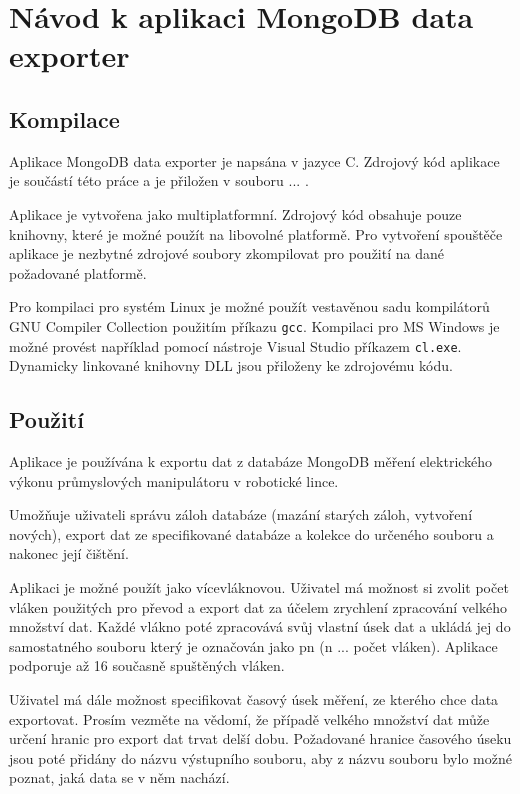 \chapter{Návod k aplikaci MongoDB data exporter}
\label{appendix1}
\section{Kompilace}

Aplikace MongoDB data exporter je napsána v jazyce C. Zdrojový kód aplikace je součástí této práce a je přiložen v souboru ... .

Aplikace je vytvořena jako multiplatformní. Zdrojový kód obsahuje pouze knihovny, které je možné použít na libovolné platformě. Pro vytvoření spouštěče aplikace je nezbytné zdrojové soubory zkompilovat pro použití na dané požadované platformě.

Pro kompilaci pro systém Linux je možné použít vestavěnou sadu kompilátorů GNU Compiler Collection použitím příkazu \texttt{gcc}. Kompilaci pro MS Windows je možné provést například pomocí nástroje Visual Studio příkazem \texttt{cl.exe}. Dynamicky linkované knihovny DLL jsou přiloženy ke zdrojovému kódu.  

\section{Použití}

Aplikace je používána k exportu dat z databáze MongoDB měření elektrického výkonu průmyslových manipulátoru v robotické lince.

Umožňuje uživateli správu záloh databáze (mazání starých záloh, vytvoření nových), export dat ze specifikované databáze a kolekce do určeného souboru a nakonec její čištění.

Aplikaci je možné použít jako vícevláknovou. Uživatel má možnost si zvolit počet vláken použitých pro převod a export dat za účelem zrychlení zpracování velkého množství dat. Každé vlákno poté zpracovává svůj vlastní úsek dat a ukládá jej do samostatného souboru který je označován jako pn (n ... počet vláken). Aplikace podporuje až 16 současně spuštěných vláken. 

Uživatel má dále možnost specifikovat časový úsek měření, ze kterého chce data exportovat. Prosím vezměte na vědomí, že případě velkého množství dat může určení hranic pro export dat trvat delší dobu. Požadované hranice časového úseku jsou poté přidány do názvu výstupního souboru, aby z názvu souboru bylo možné poznat, jaká data se v něm nachází.

